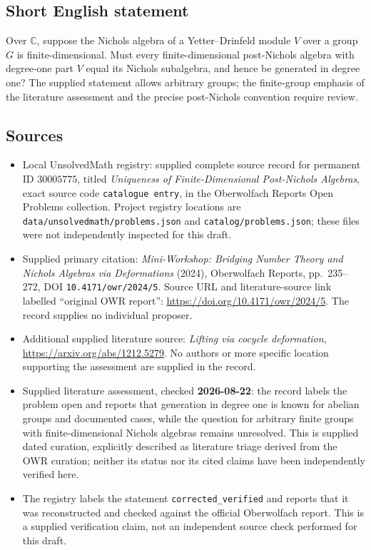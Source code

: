 \documentclass[11pt]{article}
\newcommand{\C}{\mathbb{C}}
\begin{document}
\subsection{Short English statement}
Over \(\C\), suppose the Nichols algebra of a Yetter--Drinfeld module \(V\) over a group \(G\) is finite-dimensional. Must every finite-dimensional post-Nichols algebra with degree-one part \(V\) equal its Nichols subalgebra, and hence be generated in degree one? The supplied statement allows arbitrary groups; the finite-group emphasis of the literature assessment and the precise post-Nichols convention require review.
\subsection{Sources}
\begin{itemize}
\item Local UnsolvedMath registry: supplied complete source record for permanent ID \(30005775\), titled \emph{Uniqueness of Finite-Dimensional Post-Nichols Algebras}, exact source code \texttt{catalogue entry}, in the Oberwolfach Reports Open Problems collection. Project registry locations are \texttt{data/unsolvedmath/problems.json} and \texttt{catalog/problems.json}; these files were not independently inspected for this draft.
\item Supplied primary citation: \emph{Mini-Workshop: Bridging Number Theory and Nichols Algebras via Deformations} (2024), Oberwolfach Reports, pp.\ 235--272, DOI \texttt{10.4171/owr/2024/5}. Source URL and literature-source link labelled ``original OWR report'': \url{https://doi.org/10.4171/owr/2024/5}. The record supplies no individual proposer.
\item Additional supplied literature source: \emph{Lifting via cocycle deformation}, \url{https://arxiv.org/abs/1212.5279}. No authors or more specific location supporting the assessment are supplied in the record.
\item Supplied literature assessment, checked \textbf{2026-08-22}: the record labels the problem open and reports that generation in degree one is known for abelian groups and documented cases, while the question for arbitrary finite groups with finite-dimensional Nichols algebras remains unresolved. This is supplied dated curation, explicitly described as literature triage derived from the OWR curation; neither its status nor its cited claims have been independently verified here.
\item The registry labels the statement \texttt{corrected\_verified} and reports that it was reconstructed and checked against the official Oberwolfach report. This is a supplied verification claim, not an independent source check performed for this draft.
\end{itemize}
\end{document}

